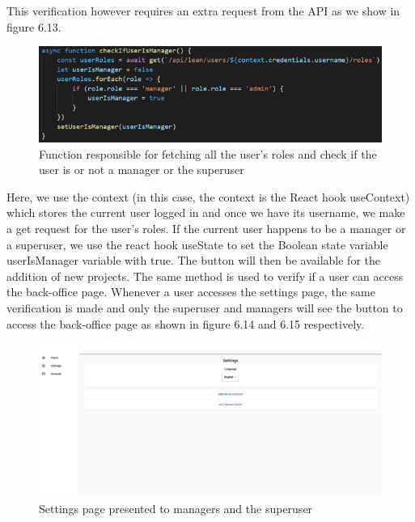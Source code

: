 \documentclass[a4paper,twoside,10pt]{report}
\begin{document}
\pagebreak
This verification however requires an extra request from the API as we show in figure 6.13.
\begin{figure}[h!]
\center
  \includegraphics[width=\textwidth]{checkIfUserIsManager.png}
\caption{Function responsible for fetching all the user's roles and check if the user is or not a manager or the superuser}
\end{figure}

\newpage
Here, we use the context (in this case, the context is the React hook useContext) which stores the current user logged in and once we have its username, we make a get request for the user's roles. 
If the current user happens to be a manager or a superuser, we use the react hook useState to set the Boolean state variable userIsManager variable with true. The button will then be available for the addition of new projects.
The same method is used to verify if a user can access the back-office page. Whenever a user accesses the settings page, the same verification is made and only the superuser and managers will see the button to access the back-office page as shown in figure 6.14 and 6.15 respectively.

\begin{figure}[h!]
\center
  \includegraphics[width=\textwidth]{settingsPage.png}
\caption{Settings page presented to managers and the superuser}
\end{figure}
\end{document}
